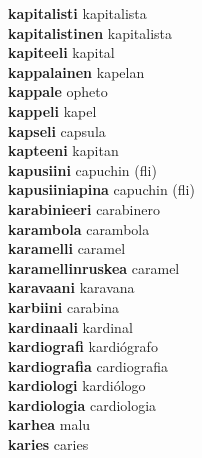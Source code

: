 \textbf{kapitalisti } kapitalista \\
\textbf{kapitalistinen } kapitalista \\
\textbf{kapiteeli } kapital \\
\textbf{kappalainen } kapelan \\
\textbf{kappale } opheto \\
\textbf{kappeli } kapel \\
\textbf{kapseli } capsula \\
\textbf{kapteeni } kapitan \\
\textbf{kapusiini } capuchin (fli) \\
\textbf{kapusiiniapina } capuchin (fli) \\
\textbf{karabinieeri } carabinero \\
\textbf{karambola } carambola \\
\textbf{karamelli } caramel \\
\textbf{karamellinruskea } caramel \\
\textbf{karavaani } karavana \\
\textbf{karbiini } carabina \\
\textbf{kardinaali } kardinal \\
\textbf{kardiografi } kardiógrafo \\
\textbf{kardiografia } cardiografia \\
\textbf{kardiologi } kardiólogo \\
\textbf{kardiologia } cardiologia \\
\textbf{karhea } malu \\
\textbf{karies } caries \\
